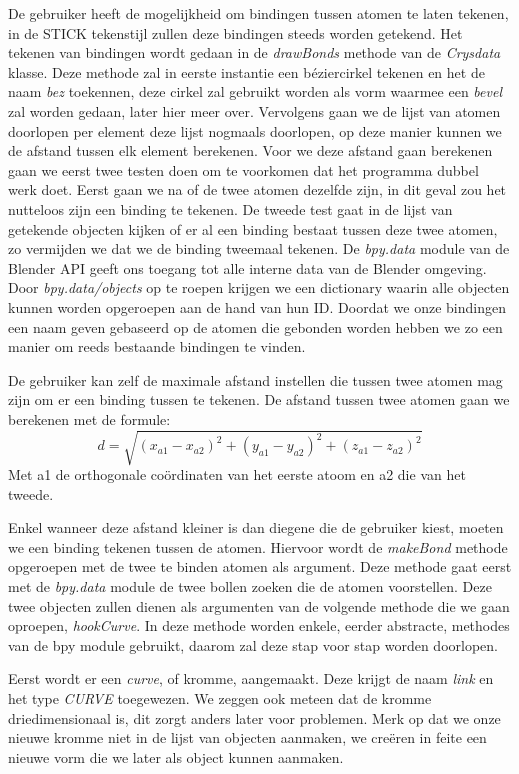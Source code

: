 De gebruiker heeft de mogelijkheid om bindingen tussen atomen te laten tekenen, in de {STICK} tekenstijl zullen deze bindingen steeds worden getekend. Het tekenen van bindingen wordt gedaan in de \textit{drawBonds} methode van de \textit{Crysdata} klasse. Deze methode zal in eerste instantie een béziercirkel tekenen en het de naam \textit{bez} toekennen, deze cirkel zal gebruikt worden als vorm waarmee een \textit{bevel} zal worden gedaan, later hier meer over. Vervolgens gaan we de lijst van atomen doorlopen per element deze lijst nogmaals doorlopen, op deze manier kunnen we de afstand tussen elk element berekenen. Voor we deze afstand gaan berekenen gaan we eerst twee testen doen om te voorkomen dat het programma dubbel werk doet. Eerst gaan we na of de twee atomen dezelfde zijn, in dit geval zou het nutteloos zijn een binding te tekenen. De tweede test gaat in de lijst van getekende objecten kijken of er al een binding bestaat tussen deze twee atomen, zo vermijden we dat we de binding tweemaal tekenen. De \textit{bpy.data} module van de Blender API geeft ons toegang tot alle interne data van de Blender omgeving. Door \textit{bpy.data/objects} op te roepen krijgen we een dictionary waarin alle objecten kunnen worden opgeroepen aan de hand van hun ID. Doordat we onze bindingen een naam geven gebaseerd op de atomen die gebonden worden hebben we zo een manier om reeds bestaande bindingen te vinden.
\par
De gebruiker kan zelf de maximale afstand instellen die tussen twee atomen mag zijn om er een binding tussen te tekenen. De afstand tussen twee atomen gaan we berekenen met de formule:
\[ d = \sqrt{(x_{a1}-x_{a2})^2+(y_{a1}-y_{a2})^2+(z_{a1}-z_{a2})^2}\]   
Met a1 de orthogonale coördinaten van het eerste atoom en a2 die van het tweede.
\par
Enkel wanneer deze afstand kleiner is dan diegene die de gebruiker kiest, moeten we een binding tekenen tussen de atomen. Hiervoor wordt de \textit{makeBond} methode opgeroepen met de twee te binden atomen als argument. Deze methode gaat eerst met de \textit{bpy.data} module de twee bollen zoeken die de atomen voorstellen. Deze twee objecten zullen dienen als argumenten van de volgende methode die we gaan oproepen, \textit{hookCurve}. In deze methode worden enkele, eerder abstracte, methodes van de bpy module gebruikt, daarom zal deze stap voor stap worden doorlopen.



Eerst wordt er een \textit{curve}, of kromme,  aangemaakt. Deze krijgt de naam \textit{link} en het type \textit{CURVE} toegewezen. We zeggen ook meteen dat de kromme driedimensionaal is, dit zorgt anders later voor problemen. Merk op dat we onze nieuwe kromme niet in de lijst van objecten aanmaken, we creëren in feite een nieuwe vorm die we later als object kunnen aanmaken. 


